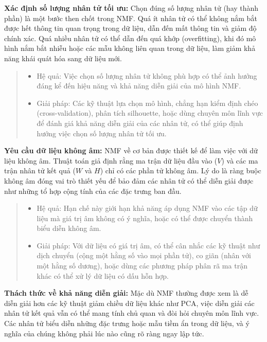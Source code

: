 \textbf{Xác định số lượng nhân tử tối ưu:} Chọn đúng số lượng nhân tử (hay thành phần) là một bước then chốt trong NMF. Quá ít nhân tử có thể không nắm bắt được hết thông tin quan trọng trong dữ liệu, dẫn đến mất thông tin và giảm độ chính xác. Quá nhiều nhân tử có thể dẫn đến quá khớp (overfitting), khi đó mô hình nắm bắt nhiễu hoặc các mẫu không liên quan trong dữ liệu, làm giảm khả năng khái quát hóa sang dữ liệu mới.

\begin{quote}
\begin{itemize}
\item
  Hệ quả: Việc chọn số lượng nhân tử không phù hợp có thể ảnh hưởng đáng kể đến hiệu năng và khả năng diễn giải của mô hình NMF.
\item
  Giải pháp: Các kỹ thuật lựa chọn mô hình, chẳng hạn kiểm định chéo (cross-validation), phân tích silhouette, hoặc dùng chuyên môn lĩnh vực để đánh giá khả năng diễn giải của các nhân tử, có thể giúp định hướng việc chọn số lượng nhân tử tối ưu.
\end{itemize}
\end{quote}

\textbf{Yêu cầu dữ liệu không âm:} NMF về cơ bản được thiết kế để làm việc với dữ liệu không âm. Thuật toán giả định rằng ma trận dữ liệu đầu vào (\(V\)) và các ma trận nhân tử kết quả (\(W\) và \(H\)) chỉ có các phần tử không âm. Lý do là ràng buộc không âm đóng vai trò thiết yếu để bảo đảm các nhân tử có thể diễn giải được như những tổ hợp cộng tính của các đặc trưng ban đầu.

\begin{quote}
\begin{itemize}
\item
  Hệ quả: Hạn chế này giới hạn khả năng áp dụng NMF vào các tập dữ liệu mà giá trị âm không có ý nghĩa, hoặc có thể được chuyển thành biểu diễn không âm.
\item
  Giải pháp: Với dữ liệu có giá trị âm, có thể cân nhắc các kỹ thuật như dịch chuyển (cộng một hằng số vào mọi phần tử), co giãn (nhân với một hằng số dương), hoặc dùng các phương pháp phân rã ma trận khác có thể xử lý dữ liệu có dấu hỗn hợp.
\end{itemize}
\end{quote}

\textbf{Thách thức về khả năng diễn giải:} Mặc dù NMF thường được xem là dễ diễn giải hơn các kỹ thuật giảm chiều dữ liệu khác như PCA, việc diễn giải các nhân tử kết quả vẫn có thể mang tính chủ quan và đòi hỏi chuyên môn lĩnh vực. Các nhân tử biểu diễn những đặc trưng hoặc mẫu tiềm ẩn trong dữ liệu, và ý nghĩa của chúng không phải lúc nào cũng rõ ràng ngay lập tức.

